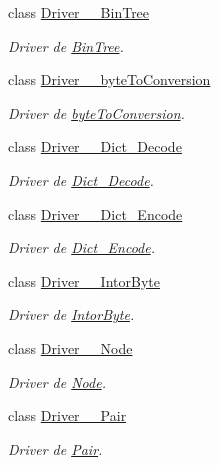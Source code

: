 \begin{DoxyCompactItemize}
class \hyperlink{classdomini_1_1utils_1_1Driver____BinTree}{Driver\+\_\+\+\_\+\+Bin\+Tree}
\begin{DoxyCompactList}\small\item\em Driver de \hyperlink{classdomini_1_1utils_1_1BinTree}{Bin\+Tree}. \end{DoxyCompactList}\item 
class \hyperlink{classdomini_1_1utils_1_1Driver____byteToConversion}{Driver\+\_\+\+\_\+byte\+To\+Conversion}
\begin{DoxyCompactList}\small\item\em Driver de \hyperlink{classdomini_1_1utils_1_1byteToConversion}{byte\+To\+Conversion}. \end{DoxyCompactList}\item 
class \hyperlink{classdomini_1_1utils_1_1Driver____Dict__Decode}{Driver\+\_\+\+\_\+\+Dict\+\_\+\+Decode}
\begin{DoxyCompactList}\small\item\em Driver de \hyperlink{classdomini_1_1utils_1_1Dict__Decode}{Dict\+\_\+\+Decode}. \end{DoxyCompactList}\item 
class \hyperlink{classdomini_1_1utils_1_1Driver____Dict__Encode}{Driver\+\_\+\+\_\+\+Dict\+\_\+\+Encode}
\begin{DoxyCompactList}\small\item\em Driver de \hyperlink{classdomini_1_1utils_1_1Dict__Encode}{Dict\+\_\+\+Encode}. \end{DoxyCompactList}\item 
class \hyperlink{classdomini_1_1utils_1_1Driver____IntorByte}{Driver\+\_\+\+\_\+\+Intor\+Byte}
\begin{DoxyCompactList}\small\item\em Driver de \hyperlink{classdomini_1_1utils_1_1IntorByte}{Intor\+Byte}. \end{DoxyCompactList}\item 
class \hyperlink{classdomini_1_1utils_1_1Driver____Node}{Driver\+\_\+\+\_\+\+Node}
\begin{DoxyCompactList}\small\item\em Driver de \hyperlink{classdomini_1_1utils_1_1Node}{Node}. \end{DoxyCompactList}\item 
class \hyperlink{classdomini_1_1utils_1_1Driver____Pair}{Driver\+\_\+\+\_\+\+Pair}
\begin{DoxyCompactList}\small\item\em Driver de \hyperlink{classdomini_1_1utils_1_1Pair}{Pair}. \end{DoxyCompactList}\item 

\end{DoxyCompactItemize}

